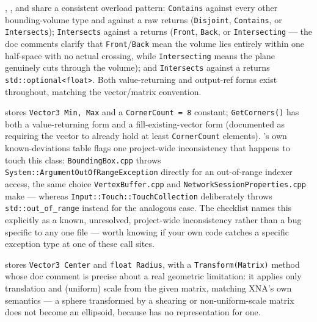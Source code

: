 , , and  share a
consistent overload pattern: \texttt{Contains} against every other bounding-volume type and
against a raw  returns  (\texttt{Disjoint},
\texttt{Contains}, or \texttt{Intersects}); \texttt{Intersects} against a 
returns  (\texttt{Front}, \texttt{Back}, or
\texttt{Intersecting} --- the doc comments clarify that \texttt{Front}/\texttt{Back} mean
the volume lies entirely within one half-space with no actual crossing, while
\texttt{Intersecting} means the plane genuinely cuts through the volume); and
\texttt{Intersects} against a  returns \texttt{std::optional<float>}. Both
value-returning and output-ref forms exist throughout, matching the vector/matrix convention.

 stores \texttt{Vector3 Min, Max} and a \texttt{CornerCount = 8}
constant; \texttt{GetCorners()} has both a value-returning form and a fill-existing-vector
form (documented as requiring the vector to already hold at least \texttt{CornerCount}
elements). 's own known-deviations table flags one project-wide
inconsistency that happens to touch this class: \texttt{BoundingBox.cpp} throws
\texttt{System::ArgumentOutOfRangeException} directly for an out-of-range indexer access, the
same choice \texttt{VertexBuffer.cpp} and \texttt{NetworkSessionProperties.cpp} make ---
whereas \texttt{Input::Touch::TouchCollection} deliberately throws \texttt{std::out\_of\_range}
instead for the analogous case. The checklist names this explicitly as a known, unresolved,
project-wide inconsistency rather than a bug specific to any one file --- worth knowing if
your own code catches a specific exception type at one of these call sites.

 stores \texttt{Vector3 Center} and \texttt{float Radius}, with a
\texttt{Transform(Matrix)} method whose doc comment is precise about a real geometric
limitation: it applies only translation and (uniform) scale from the given matrix, matching
XNA's own semantics --- a sphere transformed by a shearing or non-uniform-scale matrix does
not become an ellipsoid, because  has no representation for one.

